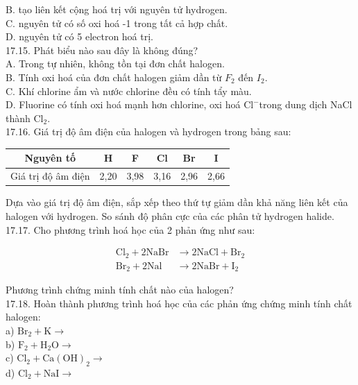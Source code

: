 \documentclass[10pt]{article}
\begin{document}
B. tạo liên kết cộng hoá trị với nguyên tử hydrogen.\\
C. nguyên tử có số oxi hoá -1 trong tất cả hợp chất.\\
D. nguyên tử có 5 electron hoá trị.\\
17.15. Phát biểu nào sau đây là không đúng?\\
A. Trong tự nhiên, không tồn tại đơn chất halogen.\\
B. Tính oxi hoá của đơn chất halogen giảm dần từ $F_{2}$ đến $I_{2}$.\\
C. Khí chlorine ẩm và nước chlorine đều có tính tẩy màu.\\
D. Fluorine có tính oxi hoá mạnh hơn chlorine, oxi hoá $\mathrm{Cl}^{-}$trong dung dịch NaCl thành $\mathrm{Cl}_{2}$.\\
17.16. Giá trị độ âm điện của halogen và hydrogen trong bảng sau:

\begin{center}
\begin{tabular}{|c|c|c|c|c|c|}
\hline
Nguyên tố & H & F & Cl & Br & I \\
\hline
Giá trị độ âm điện & 2,20 & 3,98 & 3,16 & 2,96 & 2,66 \\
\hline
\end{tabular}
\end{center}

Dựa vào giá trị độ âm điện, sắp xếp theo thứ tự giảm dần khả năng liên kết của halogen với hydrogen. So sánh độ phân cực của các phân tử hydrogen halide.\\
17.17. Cho phương trình hoá học của 2 phản ứng như sau:

$$
\begin{aligned}
\mathrm{Cl}_{2}+2 \mathrm{NaBr} & \rightarrow 2 \mathrm{NaCl}+\mathrm{Br}_{2} \\
\mathrm{Br}_{2}+2 \mathrm{Nal} & \rightarrow 2 \mathrm{NaBr}+\mathrm{I}_{2}
\end{aligned}
$$

Phương trình chứng minh tính chất nào của halogen?\\
17.18. Hoàn thành phương trình hoá học của các phản ứng chứng minh tính chất halogen:\\
a) $\mathrm{Br}_{2}+\mathrm{K} \rightarrow$\\
b) $\mathrm{F}_{2}+\mathrm{H}_{2} \mathrm{O} \rightarrow$\\
c) $\mathrm{Cl}_{2}+\mathrm{Ca}(\mathrm{OH})_{2} \rightarrow$\\
d) $\mathrm{Cl}_{2}+\mathrm{NaI} \rightarrow$
\end{document}
